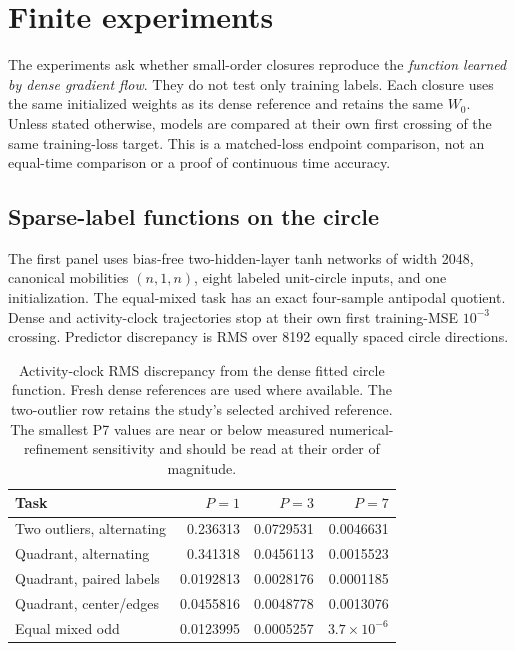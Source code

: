\section{Finite experiments}
\label{sec:experiments}

The experiments ask whether small-order closures reproduce the \emph{function
learned by dense gradient flow}.  They do not test only training labels.  Each
closure uses the same initialized weights as its dense reference and retains
the same $W_0$.  Unless stated otherwise, models are compared at their own
first crossing of the same training-loss target.  This is a matched-loss
endpoint comparison, not an equal-time comparison or a proof of continuous
time accuracy.

\subsection{Sparse-label functions on the circle}

The first panel uses bias-free two-hidden-layer tanh networks of width 2048,
canonical mobilities $(n,1,n)$, eight labeled unit-circle inputs, and one
initialization.  The equal-mixed task has an exact four-sample antipodal
quotient.  Dense and activity-clock trajectories stop at their own first
training-MSE $10^{-3}$ crossing.  Predictor discrepancy is RMS over 8192
equally spaced circle directions.

\begin{table}[t]
\centering
\small
\caption{Activity-clock RMS discrepancy from the dense fitted circle function.
Fresh dense references are used where available.  The two-outlier row retains
the study's selected archived reference.  The smallest P7 values are near or
below measured numerical-refinement sensitivity and should be read at their
order of magnitude.}
\label{tab:circle}
\begin{tabular}{@{}lrrr@{}}
\toprule
Task & $P=1$ & $P=3$ & $P=7$\\
\midrule
Two outliers, alternating & 0.236313 & 0.0729531 & 0.0046631\\
Quadrant, alternating & 0.341318 & 0.0456113 & 0.0015523\\
Quadrant, paired labels & 0.0192813 & 0.0028176 & 0.0001185\\
Quadrant, center/edges & 0.0455816 & 0.0048778 & 0.0013076\\
Equal mixed odd & 0.0123995 & 0.0005257 & $3.7\times10^{-6}$\\
\bottomrule
\end{tabular}
\end{table}

